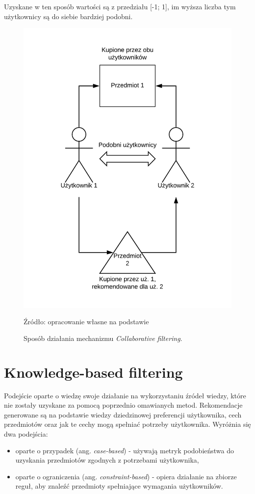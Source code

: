 Uzyskane w ten sposób wartości są z przedziału [-1; 1], im wyższa liczba tym użytkownicy są do siebie bardziej podobni.

\begin{figure}
    \centering
    \includegraphics[scale=0.7]{images/collaborative.png}
    \caption{Sposób działania mechanizmu \textit{Collaborative filtering}.}
    Źródło: opracowanie własne na podstawie \cite{challenges_solutions_survey}
    \label{fig:collaborative}
\end{figure}

\section{Knowledge-based filtering}

Podejście oparte o wiedzę swoje działanie na wykorzystaniu źródeł wiedzy, które nie zostały uzyskane za pomocą poprzednio omawianych metod. Rekomendacje generowane są na podstawie wiedzy dziedzinowej preferencji użytkownika, cech przedmiotów oraz jak te cechy mogą spełniać potrzeby użytkownika. Wyróżnia się dwa podejścia:
\begin{itemize}
    \item oparte o przypadek (ang. \textit{case-based}) - używają  metryk podobieństwa do uzyskania przedmiotów zgodnych z potrzebami użytkownika,
    \item oparte o ograniczenia (ang. \textit{constraint-based}) - opiera działanie na zbiorze reguł, aby znaleźć przedmioty spełniające wymagania użytkowników.

\end{itemize}


